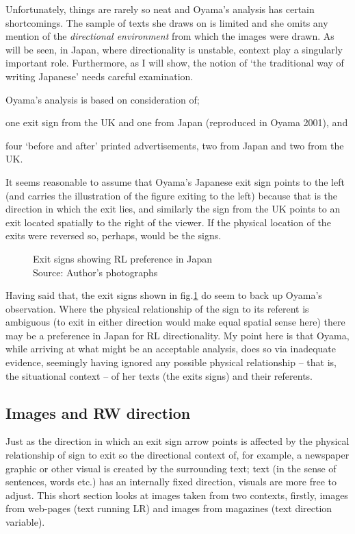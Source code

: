 \documentclass[11pt, oneside, a4paper]{scrartcl}
\newenvironment{close_enum}{
\begin{enumerate}
 \setlength{\itemsep}{1pt}
 \setlength{\parskip}{1pt}
 \setlength{\parsep}{0pt}}{\end{enumerate}
}
\begin{document}
Unfortunately, things are rarely so neat and Oyama's analysis has certain shortcomings. The sample of texts she draws on is limited and she omits any mention of the \emph{directional environment} from which the images were drawn. As will be seen, in Japan, where directionality is unstable, context play a singularly important role. Furthermore, as I will show, the notion of `the traditional way of writing Japanese' needs careful examination.

Oyama's analysis is based on consideration of;

\begin{close_enum}
\item one exit sign from the UK and one from Japan (reproduced in Oyama 2001), and
\item four `before and after' printed advertisements, two from Japan and two from the UK.
\end{close_enum}

It seems reasonable to assume that Oyama's Japanese exit sign points to the left (and carries the illustration of the figure exiting to the left) because that is the direction in which the exit lies, and similarly the sign from the UK points to an exit located spatially to the right of the viewer. If the physical location of the exits were reversed so, perhaps, would be the signs.

\begin{figure}[tb]
\begin{center}
\end{center}
\caption[Exit signs showing RL preference in Japan]{Exit signs showing RL preference in Japan\label{bidirec-exit}\\ \footnotesize Source: Author's photographs}
\end{figure}

Having said that, the exit signs shown in fig.\ref{bidirec-exit} do seem to back up Oyama's observation. Where the physical relationship of the sign to its referent is ambiguous (to exit in either direction would make equal spatial sense here) there may be a preference in Japan for RL directionality. My point here is that Oyama, while arriving at what might be an acceptable analysis, does so via inadequate evidence, seemingly having ignored any possible physical relationship -- that is, the situational context -- of her texts (the exits signs) and their referents.

\subsection{Images and RW direction}
Just as the direction in which an exit sign arrow points is affected by the physical relationship of sign to exit so the directional context of, for example, a newspaper graphic or other visual is created by the surrounding text; text (in the sense of sentences, words etc.) has an internally fixed direction, visuals are more free to adjust. This short section looks at images taken from two contexts, firstly, images from web-pages (text running LR) and images from magazines (text direction variable).
\end{document}
